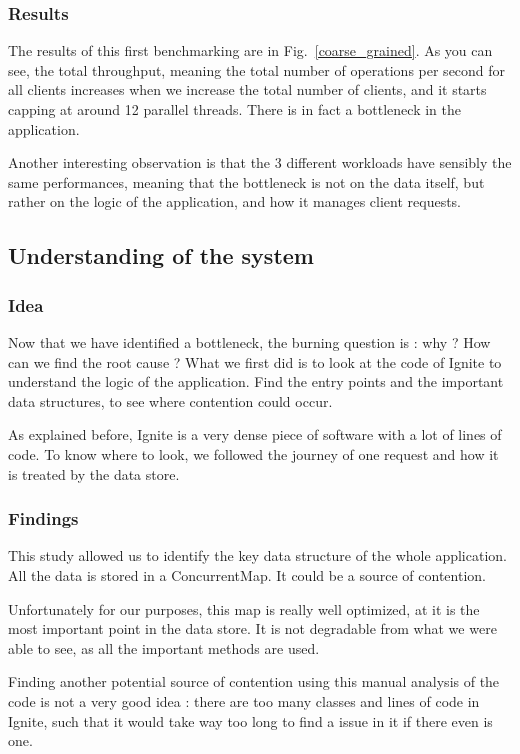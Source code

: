 \documentclass[conference]{IEEEtran}
\begin{document}
\subsubsection{Results}
The results of this first benchmarking are in Fig.~\ref{coarse_grained}.
As you can see, the total throughput, meaning the total number of operations per second for all clients increases when we increase the total number of clients, and it starts capping at around 12 parallel threads. There is in fact a bottleneck in the application.

Another interesting observation is that the 3 different workloads have sensibly the same performances, meaning that the bottleneck is not on the data itself, but rather on the logic of the application, and how it manages client requests.

\subsection{Understanding of the system}
\subsubsection{Idea}
Now that we have identified a bottleneck, the burning question is : why ? How can we find the root cause ?
What we first did is to look at the code of Ignite to understand the logic of the application. Find the entry points and the important data structures, to see where contention could occur.

As explained before, Ignite is a very dense piece of software with a lot of lines of code. To know where to look, we followed the journey of one request and how it is treated by the data store.

\subsubsection{Findings}
This study allowed us to identify the key data structure of the whole application. All the data is stored in a ConcurrentMap. It could be a source of contention.

Unfortunately for our purposes, this map is really well optimized, at it is the most important point in the data store. It is not degradable from what we were able to see, as all the important methods are used. 

Finding another potential source of contention using this manual analysis of the code is not a very good idea : there are too many classes and lines of code in Ignite, such that it would take way too long to find a issue in it if there even is one. 
\end{document}
